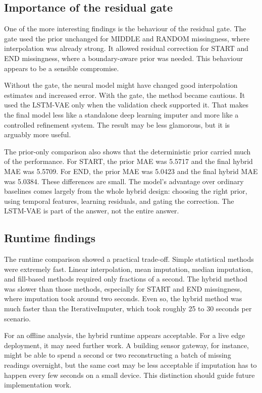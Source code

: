 \subsection{Importance of the residual gate}

One of the more interesting findings is the behaviour of the residual gate. The gate used the prior unchanged for MIDDLE and RANDOM missingness, where interpolation was already strong. It allowed residual correction for START and END missingness, where a boundary-aware prior was needed. This behaviour appears to be a sensible compromise.

Without the gate, the neural model might have changed good interpolation estimates and increased error. With the gate, the method became cautious. It used the LSTM-VAE only when the validation check supported it. That makes the final model less like a standalone deep learning imputer and more like a controlled refinement system. The result may be less glamorous, but it is arguably more useful.

The prior-only comparison also shows that the deterministic prior carried much of the performance. For START, the prior MAE was 5.5717 and the final hybrid MAE was 5.5709. For END, the prior MAE was 5.0423 and the final hybrid MAE was 5.0384. These differences are small. The model's advantage over ordinary baselines comes largely from the whole hybrid design: choosing the right prior, using temporal features, learning residuals, and gating the correction. The LSTM-VAE is part of the answer, not the entire answer.

\subsection{Runtime findings}

The runtime comparison showed a practical trade-off. Simple statistical methods were extremely fast. Linear interpolation, mean imputation, median imputation, and fill-based methods required only fractions of a second. The hybrid method was slower than those methods, especially for START and END missingness, where imputation took around two seconds. Even so, the hybrid method was much faster than the IterativeImputer, which took roughly 25 to 30 seconds per scenario.

For an offline analysis, the hybrid runtime appears acceptable. For a live edge deployment, it may need further work. A building sensor gateway, for instance, might be able to spend a second or two reconstructing a batch of missing readings overnight, but the same cost may be less acceptable if imputation has to happen every few seconds on a small device. This distinction should guide future implementation work.

